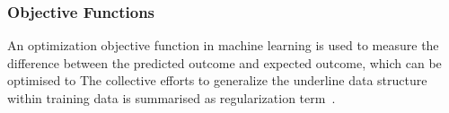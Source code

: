 \subsubsection{Objective Functions}
An optimization objective function in machine learning is used to measure the difference between the predicted outcome and expected outcome, which can be optimised to The collective efforts to generalize the underline data structure within training data is summarised as regularization term~\cite{goodfellow_2015}.  